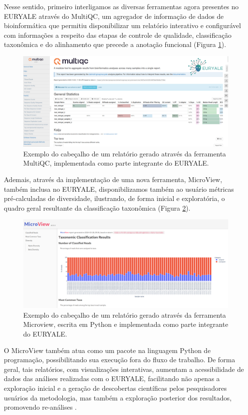 \documentclass[
	12pt,				%
	oneside,			%
	a4paper,			%
	chapter=TITLE,		%
	section=TITLE,		%
	english,			%
	brazil				%
	]{abntex2}
\begin{document}
Nesse sentido, primeiro interligamos as diversas ferramentas agora presentes no EURYALE através do MultiQC, um agregador de informação de dados de bioinformática \autocite{ewels2016} que permitiu disponibilizar um relatório interativo e configurável com informações a respeito das etapas de controle de qualidade, classificação taxonômica e do alinhamento que precede a anotação funcional (Figura \ref{fig:multiqc}).
\begin{figure}[H]

{\centering \includegraphics[width=0.7\linewidth]{figure/multiqc_example} 

}

\caption{Exemplo do cabeçalho de um relatório gerado através da ferramenta MultiQC, implementada como parte integrante do EURYALE.}\label{fig:multiqc}
\end{figure}
Ademais, através da implementação de uma nova ferramenta, MicroView, também inclusa no EURYALE, disponibilizamos também ao usuário métricas pré-calculadas de diversidade, ilustrando, de forma inicial e exploratória, o quadro geral resultante da classificação taxonômica (Figura \ref{fig:microview}).
\begin{figure}[H]

{\centering \includegraphics[width=0.7\linewidth]{figure/microview_example} 

}

\caption{Exemplo do cabeçalho de um relatório gerado através da ferramenta Microview, escrita em Python e implementada como parte integrante do EURYALE.}\label{fig:microview}
\end{figure}
O MicroView também atua como um pacote na linguagem Python de programação, possibilitando sua execução fora do fluxo de trabalho. De forma geral, tais relatórios, com visualizações interativas, aumentam a acessibilidade de dados das análises realizadas com o EURYALE, facilitando não apenas a exploração inicial e a geração de descobertas científicas pelos pesquisadores usuários da metodologia, mas também a exploração posterior dos resultados, promovendo re-análises \autocite{perkel2018}.
\end{document}
